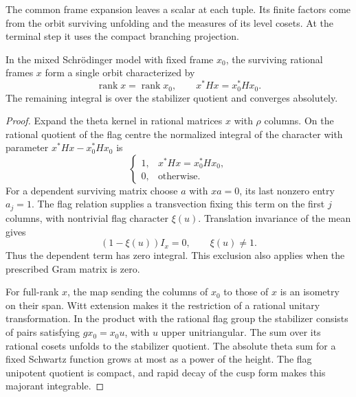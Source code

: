 The common frame expansion leaves a scalar at each tuple. Its finite factors come from the orbit surviving unfolding and the measures of its level cosets. At the terminal step
it uses the compact branching projection.

\begin{lemma}\label{lem:joint-flag-orbit}
In the mixed Schr\"odinger model with fixed frame \(x_0\), the surviving rational frames \(x\) form a single orbit characterized by
\[
 \operatorname{rank}x=\operatorname{rank}x_0,\qquad x^*Hx=x_0^*Hx_0.
\]
 The remaining integral is over
the stabilizer quotient and converges absolutely.
\end{lemma}
\begin{proof}
Expand the theta kernel in rational matrices \(x\) with \(\rho\)
columns. On the rational quotient of the flag centre the normalized
integral of the character with parameter \(x^*Hx-x_0^*Hx_0\) is
\[
 \begin{cases}1,&x^*Hx=x_0^*Hx_0,\\0,&\text{otherwise}.\end{cases}
\]
For a dependent surviving matrix choose \(a\) with \(xa=0\), its
last nonzero entry \(a_j=1\). The flag relation supplies a
transvection fixing this term on the first \(j\) columns, with
nontrivial flag character \(\xi(u)\). Translation invariance of the mean gives
\[
 (1-\xi(u))I_x=0,\qquad \xi(u)\ne1 .
\]
Thus the dependent term has zero integral. This exclusion also applies
when the prescribed Gram matrix is zero.

For full-rank \(x\), the map sending the columns of \(x_0\) to
those of \(x\) is an isometry on their span. Witt extension makes
it the restriction of a rational unitary transformation. In the
product with the rational flag group the stabilizer consists of
pairs satisfying \(g x_0=x_0u\), with \(u\) upper unitriangular.
The sum over its rational cosets unfolds to the stabilizer quotient.
The absolute theta sum for a fixed Schwartz function grows at most
as a power of the height. The flag unipotent quotient is compact,
and rapid decay of the cusp form makes this majorant integrable.
\end{proof}

